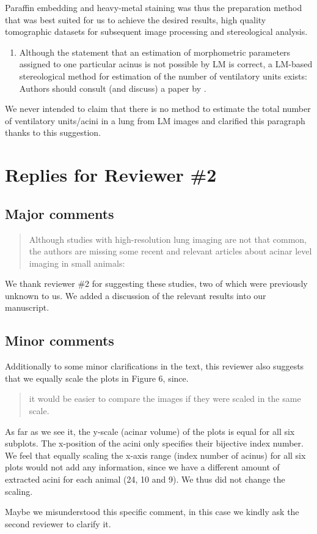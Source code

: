\documentclass[english,paper=a4,DIV=calc]{scrartcl}
\begin{document}
Paraffin embedding and heavy-metal staining was thus the preparation method that was best suited for us to achieve the desired results, high quality tomographic datasets for subsequent image processing and stereological analysis.

\begin{enumerate}[start=5]
	\item \textelp{} Although the statement that an estimation of morphometric parameters assigned to one particular acinus is not possible by LM is correct, a LM-based stereological method for estimation of the number of ventilatory units \textelp{} exists: Authors should consult (and discuss) a paper by \citet{Wulfsohn2010}.
\end{enumerate}
We never intended to claim that there is no method to estimate the total number of ventilatory units/acini in a lung from LM images and clarified this paragraph thanks to this suggestion.

\section{Replies for Reviewer \#2}
\subsection{Major comments}
\blockquote{Although studies with high-resolution lung imaging are not that common, the authors are missing some recent and relevant articles about acinar level imaging in small animals:  \textelp{}}

We thank reviewer \#2 for suggesting these studies, two of which were previously unknown to us.
We added a discussion of the relevant results into our manuscript.

\subsection{Minor comments}
Additionally to some minor clarifications in the text, this reviewer also suggests that we equally scale the plots in Figure 6, since. 

\blockquote{it would be easier to compare the images if they were scaled in the same scale.}

As far as we see it, the y-scale (acinar volume) of the plots is equal for all six subplots.
The x-position of the acini only specifies their bijective index number.
We feel that equally scaling the x-axis range (index number of acinus) for all six plots would not add any information, since we have a different amount of extracted acini for each animal (24, 10 and 9).
We thus did not change the scaling.

Maybe we misunderstood this specific comment, in this case we kindly ask the second reviewer to clarify it.



%
\end{document}
